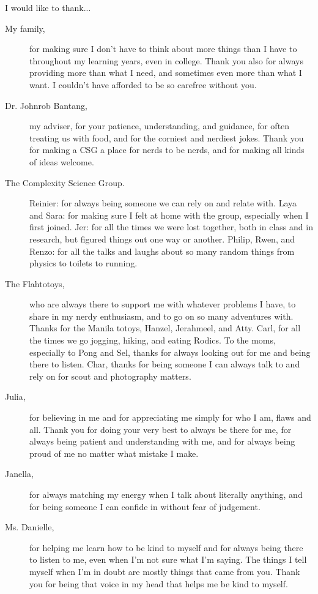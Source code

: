I would like to thank...
\begin{description}
    \item[My family,] for making sure I don't have to think about more things than I have to throughout my learning years, even in college. Thank you also for always providing more than what I need, and sometimes even more than what I want. I couldn't have afforded to be so carefree without you.
    \item[Dr. Johnrob Bantang,] my adviser, for your patience, understanding, and guidance, for often treating us with food, and for the corniest and nerdiest jokes. Thank you for making a CSG a place for nerds to be nerds, and for making all kinds of ideas welcome.
    \item[The Complexity Science Group.] Reinier: for always being someone we can rely on and relate with. Laya and Sara: for making sure I felt at home with the group, especially when I first joined. Jer: for all the times we were lost together, both in class and in research, but figured things out one way or another. Philip, Rwen, and Renzo: for all the talks and laughs about so many random things from physics to toilets to running.
    \item[The Flahtotoys,] who are always there to support me with whatever problems I have, to share in my nerdy enthusiasm, and to go on so many adventures with. Thanks for the Manila totoys, Hanzel, Jerahmeel, and Atty. Carl, for all the times we go jogging, hiking, and eating Rodics. To the moms, especially to Pong and Sel, thanks for always looking out for me and being there to listen. Char, thanks for being someone I can always talk to and rely on for scout and photography matters.
    \item[Julia,] for believing in me and for appreciating me simply for who I am, flaws and all. Thank you for doing your very best to always be there for me, for always being patient and understanding with me, and for always being proud of me no matter what mistake I make.
    \item[Janella,] for always matching my energy when I talk about literally anything, and for being someone I can confide in without fear of judgement.
    \item[Ms. Danielle,] for helping me learn how to be kind to myself and for always being there to listen to me, even when I'm not sure what I'm saying. The things I tell myself when I'm in doubt are mostly things that came from you. Thank you for being that voice in my head that helps me be kind to myself.

\end{description}
